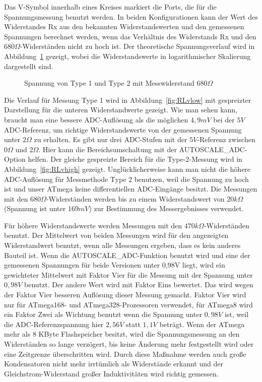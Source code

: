 Das V-Symbol innerhalb eines Kreises markiert die Ports, die für die Spannungsmessung benutzt werden.
In beiden Konfigurationen kann der Wert des Widerstandes Rx aus den bekannten Widerstandswerten
und den gemessenen Spannungen berechnet werden, wenn das Verhältnis des Widerstands Rx und den \(680\Omega\)-Widerständen
 nicht zu hoch ist.
Der theoretische Spannungsverlauf wird in Abbildung~\ref{fig:RLvtot} gezeigt, wobei die Widerstandswerte 
in logarithmischer Skalierung dargestellt sind.
\begin{figure}[H]
\centering

\caption{Spannung von Type 1 und Type 2 mit Messwiderstand \(680\Omega\) }
\label{fig:RLvtot}
\end{figure}
Die Verlauf für Messung Type 1 wird in Abbildung~\ref{fig:RLvlow} mit gespreizter Darstellung für die unteren Widerstandwerte gezeigt.
Wie man sehen kann, braucht man eine bessere ADC-Auflösung als die möglichen \(4,9mV\) bei der \(5V\) ADC-Referenz, um richtige
Widerstandswerte von der gemessenen Spannung unter \(2\Omega\) zu erhalten.
Es gibt nur drei ADC-Stufen mit der \(5V\)-Referenz zwischen \(0\Omega\) und \(2\Omega\).
Hier kann die Bereichsumschaltung mit der AUTOSCALE\_ADC-Option helfen.
Der gleiche gespreizte Bereich für die Type-2-Messung wird in Abbildung~\ref{fig:RLvhigh} gezeigt.
Unglücklicherweise kann man nicht die höhere ADC-Auflösung für Messmethode Type 2 benutzen,
weil die Spannung zu hoch ist und unser ATmega keine differentiellen ADC-Eingänge besitzt.
Die Messungen mit den \(680\Omega\)-Widerständen werden bis zu einem Widerstandswert von 
\(20k\Omega\) (Spannung ist unter \(169mV\)) zur Bestimmung des Messergebnisses verwendet.

Für höhere Widerstandswerte werden Messungen mit den \(470k\Omega\)-Widerständen benutzt.
Der Mittelwert von beiden Messungen wird für den angezeigten Widerstandwert benutzt, wenn alle Messungen ergeben,
dass es kein anderes Bauteil ist.
Wenn die AUTOSCALE\_ADC-Funktion benutzt wird und eine der gemessenen Spannungen für beide Versionen unter 0,98V liegt,
wird ein gewichteter Mittelwert mit Faktor Vier für die Messung mit der Spannung unter \(0,98V\) benutzt. Der andere Wert wird mit Faktor Eins bewertet.
Das wird wegen der Faktor Vier besseren Auflösung dieser Messung gemacht.
Faktor Vier wird nur für ATmega168- und ATmega328-Prozessoren verwendet, für ATmega8 wird ein
Faktor Zwei als Wichtung benutzt wenn die Spannung unter \(0,98V\) ist, weil die ADC-Referenzspannung hier \(2,56V\) statt \(1,1V\) beträgt.
Wenn der ATmega mehr als 8 KByte Flashspeicher besitzt, wird die Spannungsmessung an den Widerständen so lange verzögert,
bis keine Änderung mehr festgestellt wird oder eine Zeitgrenze überschritten wird.
Durch diese Maßnahme werden auch große Kondensatoren nicht mehr irrtümlich als
Widerstände erkannt und der Gleichstrom-Widerstand großer Induktivitäten wird richtig gemessen.

